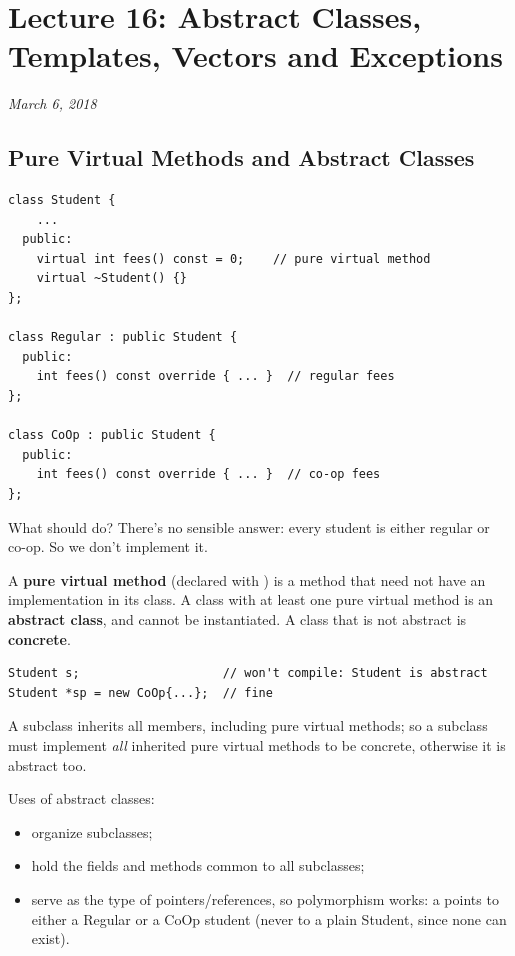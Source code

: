 \chapter{Lecture 16: Abstract Classes, Templates, Vectors and Exceptions}

\begin{center}
\textit{March 6, 2018}
\end{center}

\section{Pure Virtual Methods and Abstract Classes}
\begin{lstlisting}[style=cpp]
class Student {
    ...
  public:
    virtual int fees() const = 0;    // pure virtual method
    virtual ~Student() {}
};

class Regular : public Student {
  public:
    int fees() const override { ... }  // regular fees
};

class CoOp : public Student {
  public:
    int fees() const override { ... }  // co-op fees
};
\end{lstlisting}
What should  do? There's no sensible answer: every student
is either regular or co-op. So we don't implement it.

\begin{definition}
A \textbf{pure virtual method} (declared with ) is a method that need
not have an implementation in its class. A class with at least one pure virtual
method is an \textbf{abstract class}, and cannot be instantiated. A class that
is not abstract is \textbf{concrete}.
\end{definition}
\begin{lstlisting}[style=cpp]
Student s;                    // won't compile: Student is abstract
Student *sp = new CoOp{...};  // fine
\end{lstlisting}
A subclass inherits all members, including pure virtual methods; so a subclass
must implement \emph{all} inherited pure virtual methods to be concrete,
otherwise it is abstract too.

Uses of abstract classes:
\begin{itemize}
  \item organize subclasses;
  \item hold the fields and methods common to all subclasses;
  \item serve as the type of pointers/references, so polymorphism works: a
         points to either a Regular or a CoOp student (never to
        a plain Student, since none can exist).
\end{itemize}


